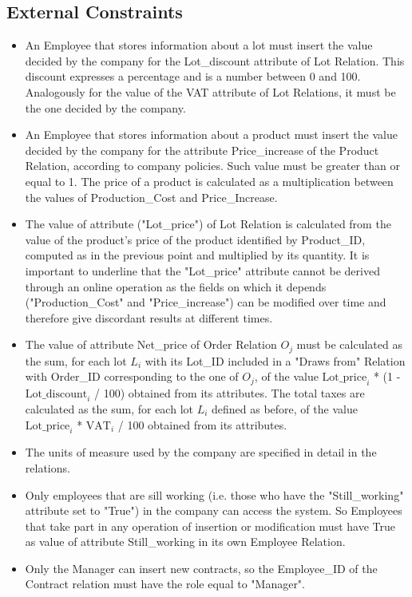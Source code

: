 \subsection{External Constraints}
\begin{itemize}
\item An Employee that stores information about a lot must insert the value decided by the company for the Lot\_discount attribute of Lot Relation. This discount expresses a percentage and is a number between 0 and 100. Analogously for the value of the VAT attribute of Lot Relations, it must be the one decided by the company.
\item An Employee that stores information about a product must insert the value decided by the company for the attribute Price\_increase of the Product Relation, according to company policies. Such value must be greater than or equal to 1. The price of a product is calculated as a multiplication between the values of Production\_Cost and Price\_Increase.
\item The value of attribute ("Lot\_price") of Lot Relation is calculated from the value of the product's price of the product identified by Product\_ID, computed as in the previous point and multiplied by its quantity. It is important to underline that the "Lot\_price" attribute cannot be derived through an online operation as the fields on which it depends ("Production\_Cost" and "Price\_increase") can be modified over time and therefore give discordant results at different times.
\item The value of attribute Net\_price of Order Relation $O_j$ must be calculated as the sum, for each lot $L_i$ with its Lot\_ID included in a "Draws from" Relation with Order\_ID corresponding to the one of $O_j$, of the value $ \mathrm{Lot\_price}_i $ * (1 - $ \mathrm{Lot\_discount}_i $ / 100) obtained from its attributes. The total taxes are calculated as the sum, for each lot $L_i$ defined as before, of the value $ \mathrm{Lot\_price}_i $ * $ \mathrm{VAT}_i $ / 100 obtained from its attributes.
\item The units of measure used by the company are specified in detail in the relations.
\item Only employees that are sill working (i.e. those who have the "Still\_working" attribute set to "True") in the company can access the system. So Employees that take part in any operation of insertion or modification must have True as value of attribute Still\_working in its own Employee Relation.
\item Only the Manager can insert new contracts, so the Employee\_ID of the Contract relation must have the role equal to "Manager". 

\end{itemize}
